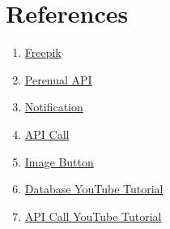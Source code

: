 \documentclass{sigchi}
\begin{document}
%
%
%
%
%
\balance{}

\section{References} 
\begin{enumerate}
    \item \href{https://www.freepik.com/}{Freepik}
    \item \href{https://perenual.com/docs/api}{Perenual API}
    \item \href{https://dev.to/jolenechong/how-to-set-up-weekly-notifications-in-android-recurring-notifications-styling-options-and-more-1b1l}{Notification}
    \item \href{https://medium.com/@imkuldeepsinghrai/api-calls-with-retrofit-in-android-kotlin-a-comprehensive-guide-e049e19deba9}{API Call}
    \item \href{https://stackoverflow.com/questions/71299760/image-button-to-open-new-activity}{Image Button}
    \item \href{https://www.youtube.com/watch?v=9LYn-OBO5qE}{Database YouTube Tutorial}
    \item \href{https://www.youtube.com/watch?v=5gFrXGbQsc8}{API Call YouTube Tutorial}
\end{enumerate}

\balance{}

\end{document}
